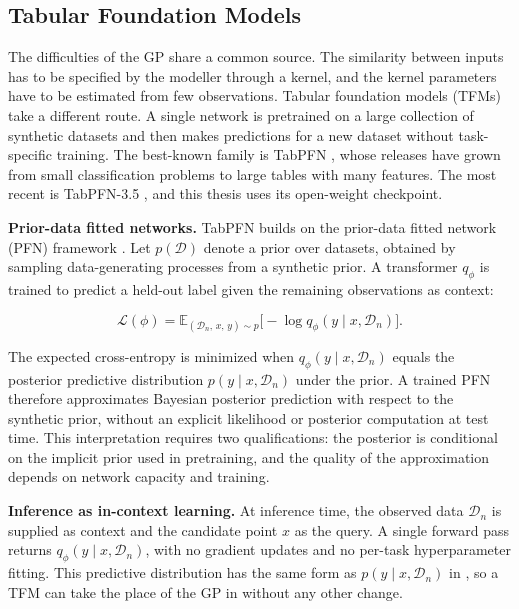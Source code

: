 \subsection{Tabular Foundation Models}\label{subsec:tabular-foundation-models}

The difficulties of the GP share a common source. The similarity between inputs has to be specified by the modeller through a kernel, and the kernel parameters have to be estimated from few observations. Tabular foundation models (TFMs) take a different route. A single network is pretrained on a large collection of synthetic datasets and then makes predictions for a new dataset without task-specific training. The best-known family is TabPFN \citep{hollmann2022tabpfn, hollmann2025accurate}, whose releases have grown from small classification problems to large tables with many features. The most recent is TabPFN-3.5 \citep{jager2026tabpfn}, and this thesis uses its open-weight checkpoint.

\textbf{Prior-data fitted networks.} TabPFN builds on the prior-data fitted network (PFN) framework \citep{muller2021transformers}. Let $p(\mathcal{D})$ denote a prior over datasets, obtained by sampling data-generating processes from a synthetic prior. A transformer $q_\phi$ is trained to predict a held-out label given the remaining observations as context:

\begin{equation}
  \mathcal{L}(\phi) = \mathbb{E}_{(\mathcal{D}_n,\, x,\, y) \sim p}\big[-\log q_\phi(y \mid x, \mathcal{D}_n)\big].
\end{equation}

The expected cross-entropy is minimized when $q_\phi(y \mid x, \mathcal{D}_n)$ equals the posterior predictive distribution $p(y \mid x, \mathcal{D}_n)$ under the prior. A trained PFN therefore approximates Bayesian posterior prediction with respect to the synthetic prior, without an explicit likelihood or posterior computation at test time. This interpretation requires two qualifications: the posterior is conditional on the implicit prior used in pretraining, and the quality of the approximation depends on network capacity and training.

\textbf{Inference as in-context learning.} At inference time, the observed data $\mathcal{D}_n$ is supplied as context and the candidate point $x$ as the query. A single forward pass returns $q_\phi(y \mid x, \mathcal{D}_n)$, with no gradient updates and no per-task hyperparameter fitting. This predictive distribution has the same form as $p(y \mid x, \mathcal{D}_n)$ in , so a TFM can take the place of the GP in  without any other change.

